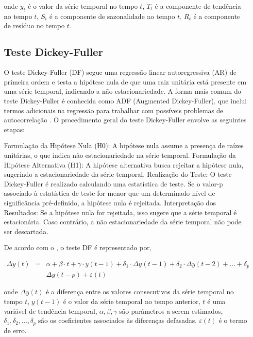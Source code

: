 onde $y_t$ é o valor da série temporal no tempo $t$, $T_t$ é a componente de tendência no tempo $t$, $S_t$ é a componente de sazonalidade no tempo $t$, $R_t$ é a componente de resíduo no tempo $t$.



\subsection{Teste Dickey-Fuller}

O teste Dickey-Fuller (DF) segue uma regressão linear autoregressiva (AR) de primeira ordem e testa a hipótese nula de que uma raiz unitária está presente em uma série temporal, indicando a não estacionariedade. A forma mais comum do teste Dickey-Fuller é conhecida como ADF (Augmented Dickey-Fuller), que inclui termos adicionais na regressão para trabalhar com possíveis problemas de autocorrelação
 \cite{Agiakloglou}. O procedimento geral do teste Dickey-Fuller envolve as seguintes etapas:

Formulação da Hipótese Nula (H0): A hipótese nula assume a presença de raízes unitárias, o que indica não estacionariedade na série temporal.
Formulação da Hipótese Alternativa (H1): A hipótese alternativa busca rejeitar a hipótese nula, sugerindo a estacionariedade da série temporal.
Realização do Teste: O teste Dickey-Fuller é realizado calculando uma estatística de teste. Se o valor-p associado à estatística de teste for menor que um determinado nível de significância pré-definido, a hipótese nula é rejeitada.
Interpretação dos Resultados: Se a hipótese nula for rejeitada, isso sugere que a série temporal é estacionária. Caso contrário, a não estacionariedade da série temporal não pode ser descartada.

De acordo com o , o teste DF é representado por,



\begin{eqnarray}
	 \Delta y(t)&=&\alpha+\beta \cdot t+\gamma \cdot y(t-1)+\delta_1 \cdot \Delta y(t-1)+\delta_2 \cdot \Delta y(t-2)+\ldots+\delta_p \\
	&&\Delta y(t-p)+\varepsilon(t)
\end{eqnarray}

\noindent onde $\Delta y(t)$ é a diferença entre os valores consecutivos da série temporal no tempo $t$, $y(t-1)$ é o valor da série temporal no tempo anterior, $t$ é uma variável de tendência temporal, $\alpha, \beta, \gamma$ são parâmetros a serem estimados, $\delta_1, \delta_2, \ldots, \delta_p$ são os coeficientes associados às diferenças defasadas, $\varepsilon(t)$ é o termo de erro.
 
